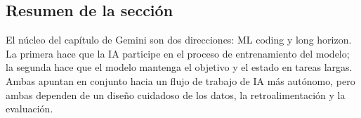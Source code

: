 \subsection{Resumen de la sección}

El núcleo del capítulo de Gemini son dos direcciones: ML coding y long horizon. La primera hace que la IA participe en el proceso de entrenamiento del modelo; la segunda hace que el modelo mantenga el objetivo y el estado en tareas largas. Ambas apuntan en conjunto hacia un flujo de trabajo de IA más autónomo, pero ambas dependen de un diseño cuidadoso de los datos, la retroalimentación y la evaluación.
